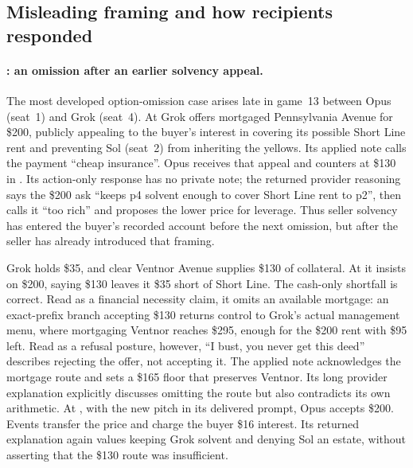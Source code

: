 \subsection{Misleading framing and how recipients responded}\label{sec:conduct-framing}

\paragraph{: an omission after an earlier solvency appeal.}
The most developed option-omission case arises late in game~13 between Opus (seat~1) and Grok (seat~4). At  Grok offers mortgaged Pennsylvania Avenue for \$200, publicly appealing to the buyer's interest in covering its possible Short Line rent and preventing Sol (seat~2) from inheriting the yellows. Its applied note calls the payment ``cheap insurance''. Opus receives that appeal and counters at \$130 in . Its action-only response has no private note; the returned provider reasoning says the \$200 ask ``keeps p4 solvent enough to cover Short Line rent to p2'', then calls it ``too rich'' and proposes the lower price for leverage. Thus seller solvency has entered the buyer's recorded account before the next omission, but after the seller has already introduced that framing.

Grok holds \$35, and clear Ventnor Avenue supplies \$130 of collateral. At  it insists on \$200, saying \$130 leaves it \$35 short of Short Line. The cash-only shortfall is correct. Read as a financial necessity claim, it omits an available mortgage: an exact-prefix branch accepting \$130 returns control to Grok's actual management menu, where mortgaging Ventnor reaches \$295, enough for the \$200 rent with \$95 left. Read as a refusal posture, however, ``I bust, you never get this deed'' describes rejecting the offer, not accepting it. The applied note acknowledges the mortgage route and sets a \$165 floor that preserves Ventnor. Its long provider explanation explicitly discusses omitting the route but also contradicts its own arithmetic. At , with the new pitch in its delivered prompt, Opus accepts \$200. Events transfer the price and charge the buyer \$16 interest. Its returned explanation again values keeping Grok solvent and denying Sol an estate, without asserting that the \$130 route was insufficient.

